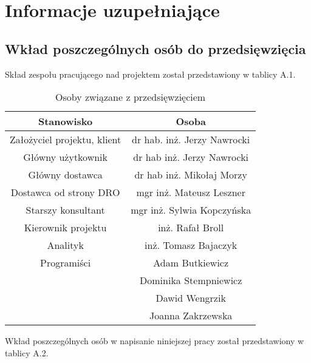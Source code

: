 \chapter{Informacje uzupełniające}
\label{Chapter10}

\section{Wkład poszczególnych osób do przedsięwzięcia}
\label{Chapter101}

Skład zespołu pracującego nad projektem został przedstawiony w tablicy A.1.

\begin{table}[h]
\centering
\begin{tabular}{ | c | c | }
\hline
\textbf{Stanowisko} & \textbf{Osoba} \\ \hline
Założyciel projektu, klient & dr hab. inż. Jerzy Nawrocki \\ \hline
Główny użytkownik & dr hab inż. Jerzy Nawrocki \\ \hline
Główny dostawca & dr hab inż. Mikołaj Morzy \\ \hline
Dostawca od strony DRO & mgr inż. Mateusz Leszner \\ \hline
Starszy konsultant & mgr inż. Sylwia Kopczyńska \\ \hline
Kierownik projektu & inż. Rafał Broll \\ \hline
Analityk & inż. Tomasz Bajaczyk \\ \hline
Programiści & Adam Butkiewicz \\ 
 & Dominika Stempniewicz \\ 
 & Dawid Wengrzik \\ 
 & Joanna Zakrzewska \\
\hline
\end{tabular}
\caption{Osoby związane z przedsięwzięciem}\label{tab:roster}
\end{table}

Wkład poszczególnych osób w napisanie niniejszej pracy został przedstawiony w tablicy A.2.

